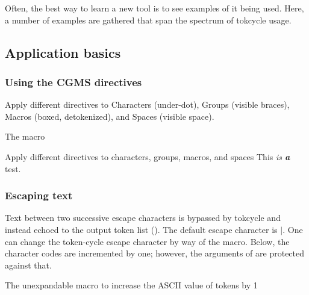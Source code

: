 \documentclass[10pt]{article}
\newcommand\TokCycle{\textsf{tokcycle}}
\begin{document}
Often, the best way to learn a new tool is to see examples of
  it being used.
Here, a number of examples are gathered that span the spectrum 
  of \TokCycle{} usage.

\subsection{Application basics}

\subsubsection{Using the CGMS directives}

Apply different directives to Characters (under-dot), Groups
  (visible braces), Macros (boxed, detokenized), and 
  Spaces (visible space).

\begin{exampleC}[]{The  macro}
\newcommand\underdot[1]{\ooalign{#1\cr\hfil{\raisebox{-5pt}{.}}\hfil}}
\end{exampleC}


\begingroup
\begin{exampleA}[lefthand width=7.8cm]{Apply different directives to
  characters{,} groups{,} macros{,} and spaces}
         {\addcytoks{\{}
          \addcytoks{\}}}
         {}
         {\addcytoks{\textvisiblespace}}
{This \textit{is \textbf{a}} test.}
\the\cytoks
\end{exampleA}

\endgroup

\subsubsection{Escaping text}

Text between two successive escape characters is bypassed
  by \TokCycle{} and instead echoed to the output token list 
  ().
The default escape character is $|$.  
One can change the token-cycle escape character by way of the
   macro.
Below, the character codes are incremented by one; however, the
  arguments of  are protected against that.

\begingroup

\begin{exampleC}[]{The unexpandable  macro to increase
 the ASCII value of tokens by 1}
\newcommand\plusl[1]{\char\numexpr`#1+1\relax}
\end{exampleC}
\end{document}
